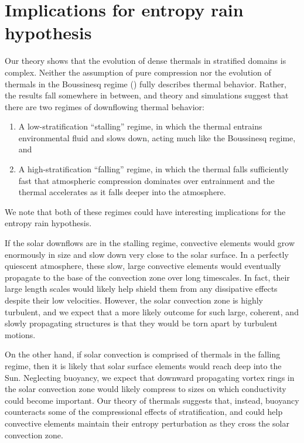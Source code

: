 \documentclass[twocolumn, amsmath, amsfonts, amssymb, trackchanges]{aastex62}
\newcommand{\LJ}{\citetalias{lecoanet&jeevanjee2018}}
\begin{document}
\section{Implications for entropy rain hypothesis}
\label{sec:implications}
Our theory shows that the evolution of dense thermals in stratified domains is complex.
Neither the assumption of pure compression \citep[as in e.g.,][]{brandenburg2016} nor the evolution of thermals in the Boussinesq regime (\LJ) fully describes thermal behavior.
Rather, the results fall somewhere in between, and theory and simulations suggest that there are two regimes of downflowing thermal behavior:
\begin{enumerate}
\item A low-stratification ``stalling'' regime, in which the thermal entrains environmental fluid and slows down, acting much like the Boussinesq regime, and
\item A high-stratification ``falling'' regime, in which the thermal falls sufficiently fast that atmospheric compression dominates over entrainment and the thermal accelerates as it falls deeper into the atmosphere.
\end{enumerate}
We note that both of these regimes could have interesting implications for the entropy rain hypothesis.

If the solar downflows are in the stalling regime, convective elements would grow enormously in size and slow down very close to the solar surface.
In a perfectly quiescent atmosphere, these slow, large convective elements would eventually propagate to the base of the convection zone over long timescales.
In fact, their large length scales would likely help shield them from any dissipative effects despite their low velocities.
However, the solar convection zone is highly turbulent, and we expect that a more likely outcome for such large, coherent, and slowly propagating structures is that they would be torn apart by turbulent motions.

On the other hand, if solar convection is comprised of thermals in the falling regime, then it is likely that solar surface elements would reach deep into the Sun.
Neglecting buoyancy, we expect that downward propagating vortex rings in the solar convection zone would likely compress to sizes on which conductivity could become important.
Our theory of thermals suggests that, instead, buoyancy counteracts some of the compressional effects of stratification, and could help convective elements maintain their entropy perturbation as they cross the solar convection zone.
\end{document}

